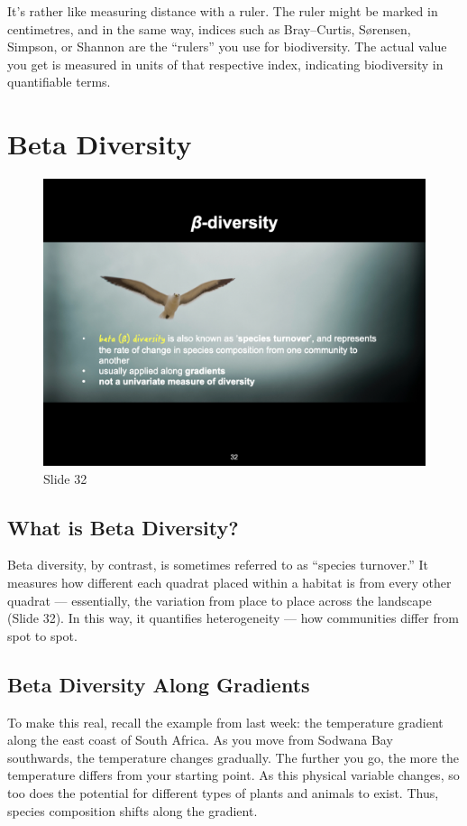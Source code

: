 \documentclass[
  10pt,
]{book}
\begin{document}
It's rather like measuring distance with a ruler. The ruler might be
marked in centimetres, and in the same way, indices such as
Bray--Curtis, Sørensen, Simpson, or Shannon are the ``rulers'' you use
for biodiversity. The actual value you get is measured in units of that
respective index, indicating biodiversity in quantifiable terms.

\section{Beta Diversity}\label{beta-diversity}

\begin{figure}[ht]
\centering
\includegraphics[width=0.8\linewidth]{../images/BDC334/BDC334-032.jpeg}
\caption*{Slide 32}
\end{figure}

\subsection{What is Beta Diversity?}\label{what-is-beta-diversity}

Beta diversity, by contrast, is sometimes referred to as ``species
turnover.'' It measures how different each quadrat placed within a
habitat is from every other quadrat --- essentially, the variation from
place to place across the landscape (Slide 32). In this way, it
quantifies heterogeneity --- how communities differ from spot to spot.

\subsection{Beta Diversity Along
Gradients}\label{beta-diversity-along-gradients}

To make this real, recall the example from last week: the temperature
gradient along the east coast of South Africa. As you move from Sodwana
Bay southwards, the temperature changes gradually. The further you go,
the more the temperature differs from your starting point. As this
physical variable changes, so too does the potential for different types
of plants and animals to exist. Thus, species composition shifts along
the gradient.
\end{document}
